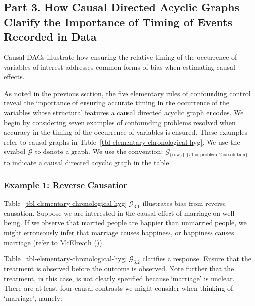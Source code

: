 \documentclass[
  single column]{article}
\begin{document}
\subsection{Part 3. How Causal Directed Acyclic Graphs Clarify the
Importance of Timing of Events Recorded in Data}\label{id-sec-3}

\begin{table}

\caption{\label{tbl-elementary-chronological-hyg}Causal DAGs illustrate
how ensuring the relative timing of the occurrence of variables of
interest addresses common forms of bias when estimating causal effects.}

\centering{

\terminologychronologicalhygeine

}

\end{table}%

As noted in the previous section, the five elementary rules of
confounding control reveal the importance of ensuring accurate timing in
the occurrence of the variables whose structural features a causal
directed acyclic graph encodes. We begin by considering seven examples
of confounding problems resolved when accuracy in the timing of the
occurrence of variables is ensured. These examples refer to causal
graphs in Table~\ref{tbl-elementary-chronological-hyg}. We use the
symbol \(\mathcal{G}\) to denote a graph. We use the convention:
\(\mathcal{G}_{\{\text{row}\}\{.\}\{1 = \text{problem}; 2 = \text{solution}\}}\)
to indicate a causal directed acyclic graph in the table.

\subsubsection{Example 1: Reverse
Causation}\label{example-1-reverse-causation}

Table~\ref{tbl-elementary-chronological-hyg} \(\mathcal{G}_{3.1}\)
illustrates bias from reverse causation. Suppose we are interested in
the causal effect of marriage on well-being. If we observe that married
people are happier than unmarried people, we might erroneously infer
that marriage causes happiness, or happiness causes marriage (refer to
McElreath ()).

Table~\ref{tbl-elementary-chronological-hyg} \(\mathcal{G}_{3.2}\)
clarifies a response. Ensure that the treatment is observed before the
outcome is observed. Note further that the treatment, in this case, is
not clearly specified because `marriage' is unclear. There are at least
four causal contrasts we might consider when thinking of `marriage',
namely:
\end{document}
